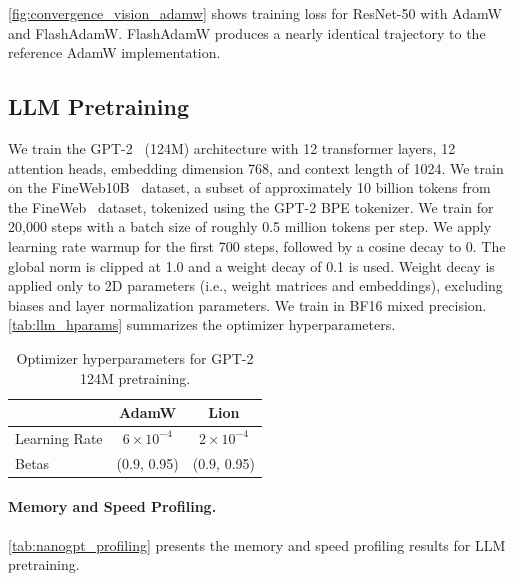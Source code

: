 \documentclass[10pt,twocolumn,letterpaper]{article}
\theoremstyle{plain}
\theoremstyle{definition}
\theoremstyle{remark}
\newcommand{\flashAdam}{FlashAdamW\xspace}
\begin{document}
\autoref{fig:convergence_vision_adamw} shows training loss for ResNet-50 with AdamW and \flashAdam. \flashAdam produces a nearly identical trajectory to the reference AdamW implementation.

\subsection{LLM Pretraining}
\label{sec:appendix_llm}

We train the GPT-2~\citep{radford2019language} (124M) architecture with 12 transformer layers, 12 attention heads, embedding dimension 768, and context length of 1024. We train on the FineWeb10B~\citep{kjj0_fineweb10b_gpt2} dataset, a subset of approximately 10 billion tokens from the FineWeb~\citep{penedo2024fineweb} dataset, tokenized using the GPT-2 BPE tokenizer. We train for 20,000 steps with a batch size of roughly 0.5 million tokens per step. We apply learning rate warmup for the first 700 steps, followed by a cosine decay to 0. The global norm is clipped at 1.0 and a weight decay of 0.1 is used. Weight decay is applied only to 2D parameters (i.e., weight matrices and embeddings), excluding biases and layer normalization parameters. We train in BF16 mixed precision. \autoref{tab:llm_hparams} summarizes the optimizer hyperparameters.


\begin{table}[ht]
\centering
\caption{Optimizer hyperparameters for GPT-2 124M pretraining.}
\label{tab:llm_hparams}
\small
\begin{tabular}{@{}lcc@{}}
\toprule
& AdamW & Lion \\
\midrule
Learning Rate & $6 \times 10^{-4}$ & $2 \times 10^{-4}$ \\
Betas & (0.9, 0.95) & (0.9, 0.95) \\
\bottomrule
\end{tabular}
\end{table}

\paragraph{Memory and Speed Profiling.}
\autoref{tab:nanogpt_profiling} presents the memory and speed profiling results for LLM pretraining.
\end{document}
